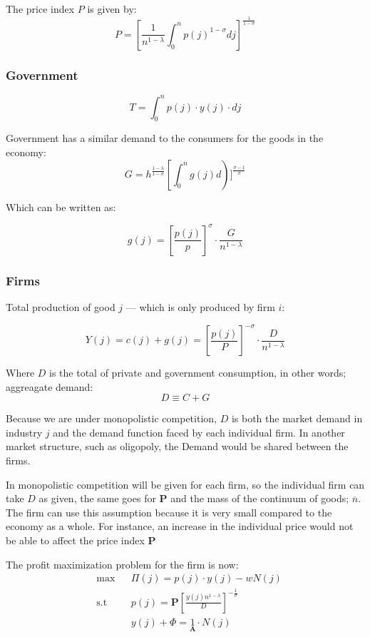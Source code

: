 The price index $P$ is given by:
$$
P = \left[\frac{1}{n^{1 - \lambda}} \int_0^n p(j)^{1 - \sigma} dj  \right]^\frac{1}{1 - \sigma}
$$

\subsubsection{Government}

$$
T = \int _ { 0 } ^ { n } p ( j ) \cdot y ( j ) \cdot d j
$$


Government has a similar demand to the consumers for the goods in the economy:
$$
G = h ^ { \frac { 1 - \lambda } { 1 - \sigma } } \left[ \int _ { 0 } ^ { n } g ( j ) d \right) ] ^ { \frac { \sigma - 1 } { \sigma } }
$$


Which can be written as:

$$
g(j) = \left[ \frac{p(j)}{p} \right]^\sigma \cdot \frac{G}{n^{1-\lambda}}
$$


\subsubsection{Firms}

Total production of good $j$ --- which is only produced by firm $i$:

$$
Y(j) = c(j) + g(j) = \left[  \frac{p(j)}{P}  \right]^{-\sigma} \cdot \frac{D}{n^{1-\lambda}}
$$

Where $D$ is the total of private and government consumption, in other words; aggreagate demand:
$$D \equiv C + G$$

Because we are under monopolistic competition, $D$ is both the market demand in industry $j$ and the demand function faced by each individual firm. In another market structure, such as oligopoly, the Demand would be shared between the firms. 

In monopolistic competition will be given for each firm, so the individual firm can take $D$ as given, the same goes for $\mathbf{P}$ and the mass of the continuum of goods; $\overline{n}$. The firm can use this assumption because it is very small compared to the economy as a whole. For instance, an increase in the individual price would not be able to affect the price index $\mathbf{P}$


The profit maximization problem for the firm is now:
\begin{equation*}
\begin{aligned}
& \underset{}{\max}
& & \Pi(j) = p(j) \cdot y(j) - wN(j) \\
& \text{s.t}
& & p(j) = \mathbf{P} \left[ \frac{y(j) n^{1-\lambda}}{D} \right]^{ - \frac{1}{\sigma}} \\
& & & y(j) + \Phi = \underset{\mathbf{A}}{1} \cdot N(j)
\end{aligned}
\end{equation*}


